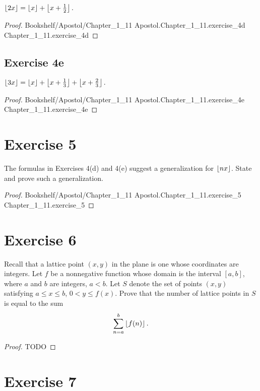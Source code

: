 \documentclass{article}
\newcommand{\link}[1]{\lean{../..}
  {Bookshelf/Apostol/Chapter\_1\_11}
  {Apostol.Chapter\_1\_11.#1}
  {Chapter\_1\_11.#1}
}
\begin{document}
$\left\lfloor2x\right\rfloor = \left\lfloor x\right\rfloor + \left\lfloor x + \frac{1}{2}\right\rfloor.$

\begin{proof}

  \link{exercise\_4d}

\end{proof}

\subsection{Exercise 4e}%
\label{sub:exercise-4e}

$\left\lfloor3x\right\rfloor = \left\lfloor x\right\rfloor + \left\lfloor x + \frac{1}{3}\right\rfloor + \left\lfloor x + \frac{2}{3}\right\rfloor.$

\begin{proof}

  \link{exercise\_4e}

\end{proof}

\section{Exercise 5}%
\label{sec:exercise-5}

The formulas in Exercises 4(d) and 4(e) suggest a generalization for
  $\left\lfloor nx\right\rfloor$.
State and prove such a generalization.

\begin{proof}

  \link{exercise\_5}

\end{proof}

\section{Exercise 6}%
\label{sec:exercise-6}

Recall that a lattice point $(x, y)$ in the plane is one whose coordinates are
  integers.
Let $f$ be a nonnegative function whose domain is the interval $[a, b]$, where
  $a$ and $b$ are integers, $a < b$.
Let $S$ denote the set of points $(x, y)$ satisfying $a \leq x \leq b$,
  $0 < y \leq f(x)$.
Prove that the number of lattice points in $S$ is equal to the sum
  $$\sum_{n=a}^b \left\lfloor f(n)\right\rfloor.$$

\begin{proof}

  TODO

\end{proof}

\section{Exercise 7}%
\label{sec:exercise-7}
\end{document}
